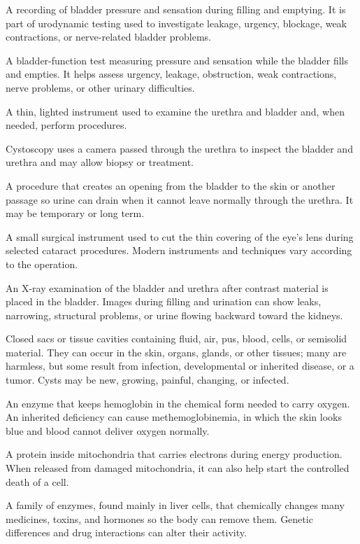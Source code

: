  A recording of bladder pressure and sensation during filling and emptying. It is part of urodynamic testing used to investigate leakage, urgency, blockage, weak contractions, or nerve-related bladder problems.

 A bladder-function test measuring pressure and sensation while the bladder fills and empties. It helps assess urgency, leakage, obstruction, weak contractions, nerve problems, or other urinary difficulties.

 A thin, lighted instrument used to examine the urethra and bladder and, when needed, perform procedures.

 Cystoscopy uses a camera passed through the urethra to inspect the bladder and urethra and may allow biopsy or treatment.

 A procedure that creates an opening from the bladder to the skin or another passage so urine can drain when it cannot leave normally through the urethra. It may be temporary or long term.

 A small surgical instrument used to cut the thin covering of the eye's lens during selected cataract procedures. Modern instruments and techniques vary according to the operation.

 An X-ray examination of the bladder and urethra after contrast material is placed in the bladder. Images during filling and urination can show leaks, narrowing, structural problems, or urine flowing backward toward the kidneys.

 Closed sacs or tissue cavities containing fluid, air, pus, blood, cells, or semisolid material. They can occur in the skin, organs, glands, or other tissues; many are harmless, but some result from infection, developmental or inherited disease, or a tumor. Cysts may be new, growing, painful, changing, or infected.

 An enzyme that keeps hemoglobin in the chemical form needed to carry oxygen. An inherited deficiency can cause methemoglobinemia, in which the skin looks blue and blood cannot deliver oxygen normally.

 A protein inside mitochondria that carries electrons during energy production. When released from damaged mitochondria, it can also help start the controlled death of a cell.

 A family of enzymes, found mainly in liver cells, that chemically changes many medicines, toxins, and hormones so the body can remove them. Genetic differences and drug interactions can alter their activity.

